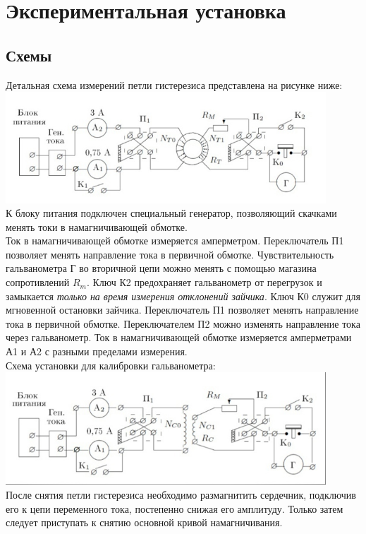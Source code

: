 \documentclass[11pt]{article}
\begin{document}
\section{Экспериментальная установка}
\subsection{Схемы}
Детальная схема измерений петли гистерезиса представлена на рисунке ниже:\\
\includegraphics[width=12cm]{g2}\\
К блоку питания подключен специальный генератор, позволяющий скачками менять токи в намагничивающей обмотке.\\
Ток в намагничивающей обмотке измеряется амперметром. Переключатель П1 позволяет менять направление тока в первичной обмотке. Чувствительность гальванометра Г во вторичной цепи можно менять с помощью магазина сопротивлений $R_m$. Ключ К2 предохраняет гальванометр от перегрузок и замыкается \textit{только на время измерения отклонений зайчика}. Ключ К0 служит для мгновенной остановки зайчика. Переключатель П1 позволяет менять направление тока в первичной обмотке. Переключателем П2 можно изменять направление тока через гальванометр. Ток в намагничивающей обмотке измеряется амперметрами А1 и А2 с разными пределами измерения.\\
Схема установки для калибровки гальванометра:\\
\includegraphics[width=12cm]{g3}\\
После снятия петли гистерезиса необходимо размагнитить сердечник, подключив его к цепи переменного тока, постепенно снижая его амплитуду. Только затем следует приступать к снятию основной кривой намагничивания.\\
\end{document}
